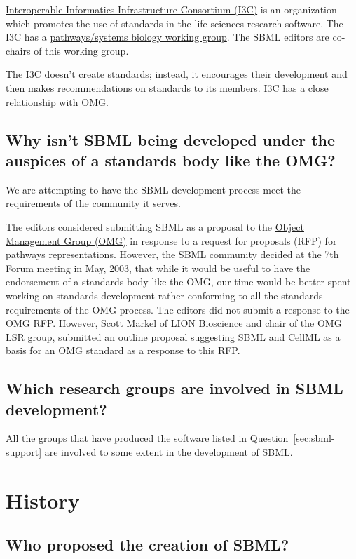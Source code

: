 \documentclass{sbmlfaq}
\begin{document}
\href{http://www.i3c.org/}{Interoperable Informatics Infrastructure
  Consortium (I3C)} is an organization which promotes the use of standards
in the life sciences research software.  The I3C has a
\href{http://www.i3c.org/wgr/psb/psb.asp}{pathways/systems biology working
  group}.  The SBML editors are co-chairs of this working group.

The I3C doesn't create standards; instead, it encourages their development
and then makes recommendations on standards to its members.  I3C has a
close relationship with OMG.


\subsection{Why isn't SBML being developed under the auspices of a
  standards body like the OMG?} 

We are attempting to have the SBML development process meet the
requirements of the community it serves.

The editors considered submitting SBML as a proposal to the
\href{http://www.omg.org/}{Object Management Group (OMG)} in response to a
request for proposals (RFP) for pathways representations.  However, the
SBML community decided at the 7th Forum meeting in May, 2003, that while it
would be useful to have the endorsement of a standards body like the OMG,
our time would be better spent working on standards development rather
conforming to all the standards requirements of the OMG process.  The
editors did not submit a response to the OMG RFP.  However, Scott Markel of
LION Bioscience and chair of the OMG LSR group, submitted an outline
proposal suggesting SBML and CellML as a basis for an OMG standard as a
response to this RFP.


\subsection{Which research groups are involved in SBML development?}

All the groups that have produced the software listed in Question~\ref{sec:sbml-support} are involved
to some extent in the development of SBML.

\section{History}
\label{sec:history}

\subsection{Who proposed the creation of SBML?}
\end{document}
